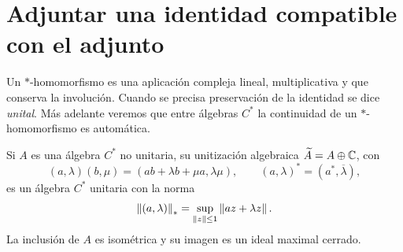 \section{Adjuntar una identidad compatible con el adjunto}\label{lec:v3-26}

Un $*$-homomorfismo es una aplicación compleja lineal, multiplicativa y que conserva la involución. Cuando se precisa preservación de la identidad se dice \emph{unital}. Más adelante veremos que entre álgebras $C^*$ la continuidad de un $*$-homomorfismo es automática.

\begin{teorema}[Unitización $C^*$]\label{v3:unitizacion-cstar}
Si $A$ es una álgebra $C^*$ no unitaria, su unitización algebraica $\widetilde A=A\oplus\mathbb C$, con
\[
 (a,\lambda)(b,\mu)=(ab+\lambda b+\mu a,\lambda\mu),\qquad
 (a,\lambda)^*=(a^*,\overline\lambda),
\]
es un álgebra $C^*$ unitaria con la norma
\[
 \left\lVert(a,\lambda)\right\rVert_*=\sup_{\left\lVert z\right\rVert\le1}\left\lVert az+\lambda z\right\rVert.
\]
La inclusión de $A$ es isométrica y su imagen es un ideal maximal cerrado.
\end{teorema}
